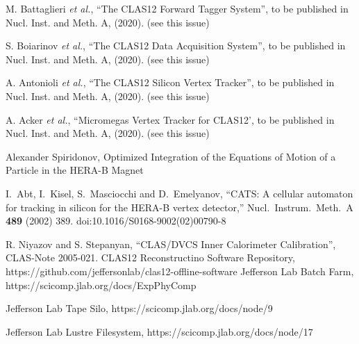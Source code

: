 \documentclass[3p,times,twocolumn]{elsarticle}
\begin{document}
\begin{thebibliography}{99}
M. Battaglieri {\it et al.}, ``The CLAS12 Forward Tagger System'', to be published in Nucl. Inst. and
Meth. A, (2020). (see this issue)

S. Boiarinov {\it et al.}, ``The CLAS12 Data Acquisition System'', to be published in Nucl. Inst. and
Meth. A, (2020). (see this issue)

A. Antonioli {\it et al.}, ``The CLAS12 Silicon Vertex Tracker'', to be published in Nucl. Inst. and
Meth. A, (2020). (see this issue)

A. Acker {\it et al.}, ``Micromegas Vertex Tracker for CLAS12', to be published in Nucl. Inst. and
Meth. A, (2020). (see this issue)

Alexander Spiridonov, Optimized Integration of the Equations of Motion of a Particle in the HERA-B Magnet

I.~Abt, I.~Kisel, S.~Masciocchi and D.~Emelyanov,
``CATS: A cellular automaton for tracking in silicon for the HERA-B vertex detector,''
Nucl.\ Instrum.\ Meth.\ A {\bf 489} (2002) 389.
doi:10.1016/S0168-9002(02)00790-8

R. Niyazov and S. Stepanyan, ``CLAS/DVCS Inner Calorimeter Calibration'', CLAS-Note 2005-021.
{CLAS12 Reconstructino Software Repository},
https://github.com/jeffersonlab/clas12-offline-software
{Jefferson Lab Batch Farm},
https://scicomp.jlab.org/docs/ExpPhyComp

{Jefferson Lab Tape Silo},
https://scicomp.jlab.org/docs/node/9

{Jefferson Lab Lustre Filesystem},
https://scicomp.jlab.org/docs/node/17

\end{thebibliography}
\end{document}
